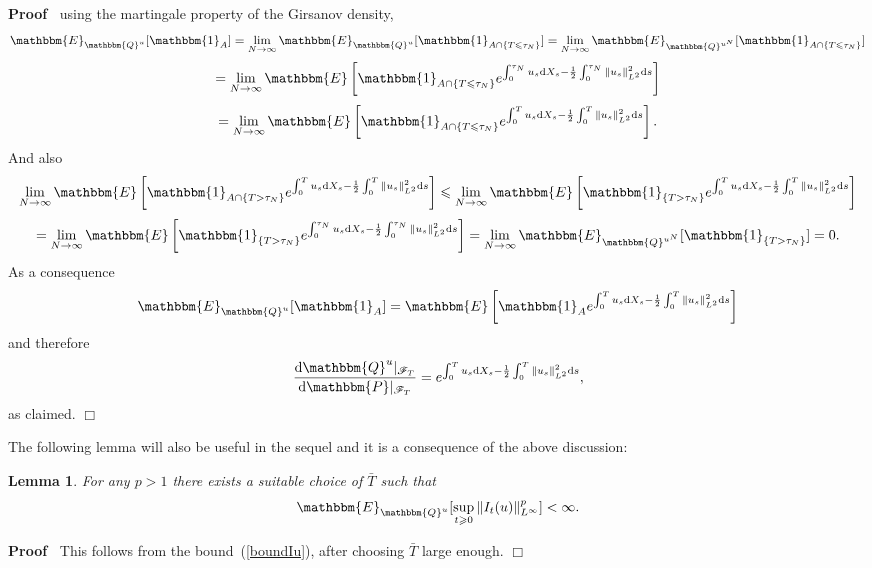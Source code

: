 \documentclass[11pt]{article}
\newcommand{\mathd}{\mathrm{d}}
\newenvironment{proof}{\noindent\textbf{Proof\ }}{\hspace*{\fill}$\Box$\medskip}
\newtheorem{lemma}{Lemma}
\newcommand{\CF}{\mathscr{F}}
\begin{document}
\begin{proof}
  using the martingale property of the Girsanov density,
  \[ \mathbbm{E}_{\mathbbm{Q}^u} [\mathbbm{1}_A] = \lim_{N \rightarrow \infty}
     \mathbbm{E}_{\mathbbm{Q}^u} [\mathbbm{1}_{A \cap \{ T \leqslant \tau_N
     \}}] = \lim_{N \rightarrow \infty} \mathbbm{E}_{\mathbbm{Q}^{u^N}}
     [\mathbbm{1}_{A \cap \{ T \leqslant \tau_N \}}] \]
  \[ = \lim_{N \rightarrow \infty} \mathbbm{E} \left[ \mathbbm{1}_{A \cap \{ T
     \leqslant \tau_N \}} e^{\int^{\tau_N}_0 u_s \mathd X_s - \frac{1}{2}
     \int^{\tau_N}_0 \| u_s \|^2_{L^2} \mathd s} \right] \]
  \[ = \lim_{N \rightarrow \infty} \mathbbm{E} \left[ \mathbbm{1}_{A \cap \{ T
     \leqslant \tau_N \}} e^{\int^T_0 u_s \mathd X_s - \frac{1}{2} \int^T_0 \|
     u_s \|^2_{L^2} \mathd s} \right] . \]
  And also
  \[ \lim_{N \rightarrow \infty} \mathbbm{E} \left[ \mathbbm{1}_{A \cap \{ T >
     \tau_N \}} e^{\int^T_0 u_s \mathd X_s - \frac{1}{2} \int^T_0 \| u_s
     \|^2_{L^2} \mathd s} \right] \leqslant \lim_{N \rightarrow \infty}
     \mathbbm{E} \left[ \mathbbm{1}_{\{ T > \tau_N \}} e^{\int^T_0 u_s \mathd
     X_s - \frac{1}{2} \int^T_0 \| u_s \|^2_{L^2} \mathd s} \right] \]
  \[ = \lim_{N \rightarrow \infty} \mathbbm{E} \left[ \mathbbm{1}_{\{ T >
     \tau_N \}} e^{\int^{\tau_N}_0 u_s \mathd X_s - \frac{1}{2}
     \int^{\tau_N}_0 \| u_s \|^2_{L^2} \mathd s} \right] = \lim_{N \rightarrow
     \infty} \mathbbm{E}_{\mathbbm{Q}^{u^N}} [\mathbbm{1}_{\{ T > \tau_N \}}]
     = 0. \]
  As a consequence
  \[ \mathbbm{E}_{\mathbbm{Q}^u} [\mathbbm{1}_A] =\mathbbm{E} \left[
     \mathbbm{1}_A e^{\int^T_0 u_s \mathd X_s - \frac{1}{2} \int^T_0 \| u_s
     \|^2_{L^2} \mathd s} \right] \]
  and therefore
  \[ \frac{\mathd \mathbbm{Q}^u |_{\CF_T}}{\mathd \mathbbm{P}|_{\CF_T}} =
     e^{\int^T_0 u_s \mathd X_s - \frac{1}{2} \int^T_0 \| u_s \|^2_{L^2}
     \mathd s}, \]
  as claimed.
\end{proof}

The following lemma will also be useful in the sequel and it is a consequence
of the above discussion:

\begin{lemma}
  For any $p > 1$ there exists a suitable choice of $\bar{T}$ such that
  \[ \mathbbm{E}_{\mathbbm{Q}^u} [\sup_{t \geqslant 0} \| I_t (u)
     \|^p_{L^{\infty}}] < \infty . \]
\end{lemma}

\begin{proof}
  This follows from the bound~(\ref{boundIu}), after choosing $\bar{T}$ large
  enough. 
\end{proof}
\end{document}
